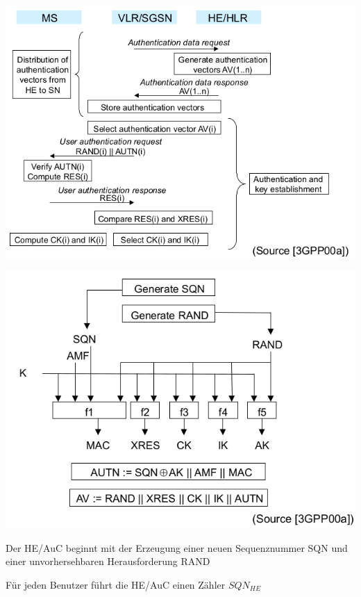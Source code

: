 \documentclass[a4paper]{article}
\begin{document}
\begin{multicols}{3}
      \begin{itemize*}
            \item \includegraphics[width=\linewidth]{Assets/NetworkSecurity-umts-authentication-mechanism.png}
            \item \includegraphics[width=\linewidth]{Assets/NetworkSecurity-umts-authentication-vectors.png}
            \begin{itemize*}
                  \item Der HE/AuC beginnt mit der Erzeugung einer neuen Sequenznummer SQN und einer unvorhersehbaren Herausforderung RAND
                  \begin{itemize*}
                        \item Für jeden Benutzer führt die HE/AuC einen Zähler $SQN_{HE}$

\end{itemize*}
\end{itemize*}
\end{itemize*}
\end{multicols}
\end{document}
